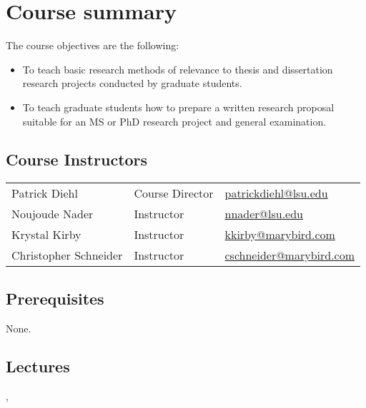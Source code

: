 \documentclass[11pt,letterpaper]{article}
\begin{document}
\section*{Course summary}
The course objectives are the following:
\begin{itemize}
\item To teach basic research methods of relevance to thesis and dissertation research projects
conducted by graduate students.
\item To teach graduate students how to prepare a written research proposal suitable for an MS or
PhD research project and general examination.
\end{itemize}



\subsection*{Course Instructors}
\begin{tabular}{lll}
Patrick Diehl & Course Director & \url{patrickdiehl@lsu.edu} \\ 
Noujoude Nader & Instructor & \url{nnader@lsu.edu} \\ 
Krystal Kirby & Instructor & \url{kkirby@marybird.com} \\
Christopher Schneider & Instructor &  \url{cschneider@marybird.com}
\end{tabular} 

\subsection*{Prerequisites}
None.

\subsection*{Lectures}
\coursedate, \courselocation
\end{document}

